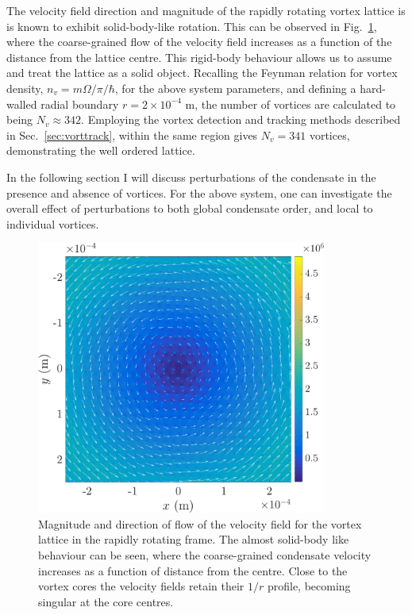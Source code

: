 The velocity field direction and magnitude of the rapidly rotating vortex lattice is is known to exhibit solid-body-like rotation. This can be observed in Fig.~\ref{fig:solidbody}, where the coarse-grained flow of the velocity field increases as a function of the distance from the lattice centre. This rigid-body behaviour allows us to assume and treat the lattice as a solid object. Recalling the Feynman relation for vortex density, $n_v = m\Omega/\pi/\hbar$, for the above system parameters, and defining a hard-walled radial boundary $r=2\times 10^{-4}$ m, the number of vortices are calculated to being $N_v \approx 342$. Employing the vortex detection and tracking methods described in Sec.~\ref{sec:vorttrack}, within the same region gives $N_v = 341$ vortices, demonstrating the well ordered lattice.

In the following section I will discuss perturbations of the condensate in the presence and absence of vortices. For the above system, one can investigate the overall effect of perturbations to both global condensate order, and local to individual vortices.

\begin{figure}\centering
    \includegraphics[width=0.85\textwidth,clip,trim={0cm 0cm 0 0cm}]{Images/ch4_vtx/velocity/solidbody}
    \caption{Magnitude and direction of flow of the velocity field for the vortex lattice in the rapidly rotating frame. The almost solid-body like behaviour can be seen, where the coarse-grained condensate velocity increases as a function of distance from the centre. Close to the vortex cores the velocity fields retain their $1/r$ profile, becoming singular at the core centres.}
    \label{fig:solidbody}
\end{figure}

